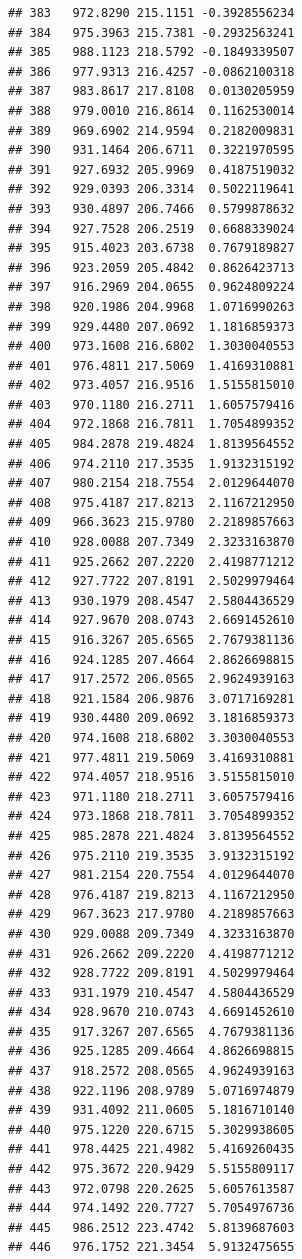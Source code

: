 \documentclass[
]{article}
\begin{document}
\begin{verbatim}
## 383   972.8290 215.1151 -0.3928556234
## 384   975.3963 215.7381 -0.2932563241
## 385   988.1123 218.5792 -0.1849339507
## 386   977.9313 216.4257 -0.0862100318
## 387   983.8617 217.8108  0.0130205959
## 388   979.0010 216.8614  0.1162530014
## 389   969.6902 214.9594  0.2182009831
## 390   931.1464 206.6711  0.3221970595
## 391   927.6932 205.9969  0.4187519032
## 392   929.0393 206.3314  0.5022119641
## 393   930.4897 206.7466  0.5799878632
## 394   927.7528 206.2519  0.6688339024
## 395   915.4023 203.6738  0.7679189827
## 396   923.2059 205.4842  0.8626423713
## 397   916.2969 204.0655  0.9624809224
## 398   920.1986 204.9968  1.0716990263
## 399   929.4480 207.0692  1.1816859373
## 400   973.1608 216.6802  1.3030040553
## 401   976.4811 217.5069  1.4169310881
## 402   973.4057 216.9516  1.5155815010
## 403   970.1180 216.2711  1.6057579416
## 404   972.1868 216.7811  1.7054899352
## 405   984.2878 219.4824  1.8139564552
## 406   974.2110 217.3535  1.9132315192
## 407   980.2154 218.7554  2.0129644070
## 408   975.4187 217.8213  2.1167212950
## 409   966.3623 215.9780  2.2189857663
## 410   928.0088 207.7349  2.3233163870
## 411   925.2662 207.2220  2.4198771212
## 412   927.7722 207.8191  2.5029979464
## 413   930.1979 208.4547  2.5804436529
## 414   927.9670 208.0743  2.6691452610
## 415   916.3267 205.6565  2.7679381136
## 416   924.1285 207.4664  2.8626698815
## 417   917.2572 206.0565  2.9624939163
## 418   921.1584 206.9876  3.0717169281
## 419   930.4480 209.0692  3.1816859373
## 420   974.1608 218.6802  3.3030040553
## 421   977.4811 219.5069  3.4169310881
## 422   974.4057 218.9516  3.5155815010
## 423   971.1180 218.2711  3.6057579416
## 424   973.1868 218.7811  3.7054899352
## 425   985.2878 221.4824  3.8139564552
## 426   975.2110 219.3535  3.9132315192
## 427   981.2154 220.7554  4.0129644070
## 428   976.4187 219.8213  4.1167212950
## 429   967.3623 217.9780  4.2189857663
## 430   929.0088 209.7349  4.3233163870
## 431   926.2662 209.2220  4.4198771212
## 432   928.7722 209.8191  4.5029979464
## 433   931.1979 210.4547  4.5804436529
## 434   928.9670 210.0743  4.6691452610
## 435   917.3267 207.6565  4.7679381136
## 436   925.1285 209.4664  4.8626698815
## 437   918.2572 208.0565  4.9624939163
## 438   922.1196 208.9789  5.0716974879
## 439   931.4092 211.0605  5.1816710140
## 440   975.1220 220.6715  5.3029938605
## 441   978.4425 221.4982  5.4169260435
## 442   975.3672 220.9429  5.5155809117
## 443   972.0798 220.2625  5.6057613587
## 444   974.1492 220.7727  5.7054976736
## 445   986.2512 223.4742  5.8139687603
## 446   976.1752 221.3454  5.9132475655

\end{verbatim}
\end{document}
